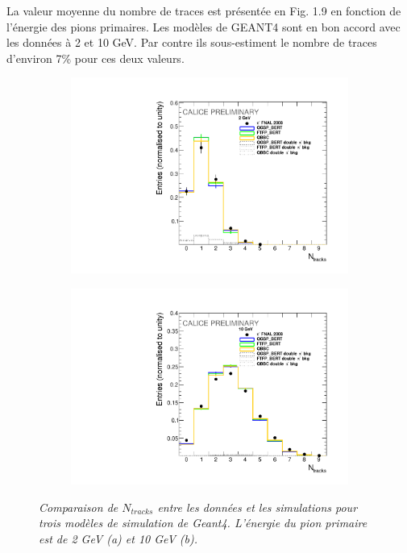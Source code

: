 La valeur moyenne du nombre de traces est présentée en Fig. 1.9 en fonction de l'énergie des pions primaires. Les modèles de GEANT4 sont en bon accord avec les données à 2 et 10 GeV. Par contre ils sous-estiment le nombre de traces d'environ 7\% pour ces deux valeurs.   

\begin{figure}
	\centering
	\begin{subfigure}{0.5\textwidth}
		\centering
		\includegraphics[width=.90\linewidth]{ECAL/plots/ntracks-2.pdf}
		\caption{\label{fig:tr2F} }
	\end{subfigure}%
	\begin{subfigure}{0.5\textwidth}
		\centering
		\includegraphics[width=.90\linewidth]{ECAL/plots/ntracks-10.pdf}
		\caption{\label{fig:tr10F} }
	\end{subfigure}
	\caption{\label{fig:NtrackF} \sl Comparaison de $N_{tracks}$ entre les données et les simulations pour trois modèles de simulation de  {\sc Geant}4. L'énergie du pion primaire est de 2 GeV (a) et 10 GeV (b).}
\end{figure}

